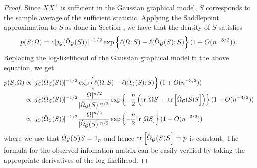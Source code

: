 \begin{proof}
    Since $XX^\top$ is sufficient in the Gaussian graphical model, $S$ corresponds to the sample average of the sufficient statistic. Applying the Saddlepoint approximation to $S$ as done in Section , we have that the density of $S$ satisfies
    \begin{equation*}
        p(S; \Omega) = c |j_{\mathcal{G}}(\hat\Omega_{\mathcal{G}}(S))|^{-1/2} \exp\left\{\ell(\Omega; S) - \ell(\hat\Omega_{\mathcal{G}}(S); S)\right\} (1 + O(n^{-3/2})).
    \end{equation*}
    Replacing the log-likelihood of the Gaussian graphical model in the above equation, we get
    \begin{align*}
        p(S; \Omega) 
        &\propto |j_{\mathcal{G}}(\hat\Omega_{\mathcal{G}}(S))|^{-1/2} \exp\left\{\ell(\Omega; S) - \ell(\hat\Omega_{\mathcal{G}}(S); S)\right\} (1 + O(n^{-3/2})) \\
        &\propto |j_{\mathcal{G}}(\hat\Omega_{\mathcal{G}}(S))|^{-1/2} 
        \frac{|\Omega|^{n/2}}{|\hat\Omega_{\mathcal{G}}(S)|^{n/2}}
        \exp\left\{-\frac{n}{2}\left({\textrm{tr}\left[\Omega S\right]} - {\textrm{tr}\left[\hat\Omega_{\mathcal{G}}(S) S\right]}\right)\right\} (1 + O(n^{-3/2}))\\
        &\propto |j_{\mathcal{G}}(\hat\Omega_{\mathcal{G}}(S))|^{-1/2} 
        \frac{|\Omega|^{n/2}}{|\hat\Omega_{\mathcal{G}}(S)|^{n/2}}
        \exp\left\{-\frac{n}{2}{\textrm{tr}\left[\Omega S\right]}\right\} (1 + O(n^{-3/2}))
    \end{align*}
    where we use that $\hat\Omega_{\mathcal{G}}(S) S = 1_p$ and hence ${\textrm{tr}\left[\hat\Omega_{\mathcal{G}}(S) S\right]} = p$ is constant. The formula for the observed infomation matrix can be easily verified by taking the appropriate derivatives of the log-likelihood.
\end{proof}

